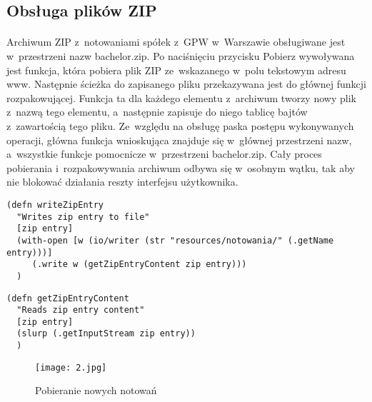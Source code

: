 \subsection{Obsługa plików ZIP}

\paragraph{}
Archiwum ZIP z~notowaniami spółek z~GPW w~Warszawie obsługiwane jest w~przestrzeni nazw bachelor.zip. Po naciśnięciu przycisku Pobierz wywoływana jest funkcja, która pobiera plik ZIP ze~wskazanego w~polu tekstowym adresu www. Następnie ścieżka do zapisanego pliku przekazywana jest do głównej funkcji rozpakowującej. Funkcja ta dla każdego elementu z~archiwum tworzy nowy plik z~nazwą tego elementu, a~następnie zapisuje do niego tablicę bajtów z~zawartością tego pliku. Ze~względu na obsługę paska postępu wykonywanych operacji, główna funkcja wnioskująca znajduje się w~głównej przestrzeni nazw, a~wszystkie funkcje pomocnicze w~przestrzeni bachelor.zip. Cały proces pobierania i~rozpakowywania archiwum odbywa się w~osobnym wątku, tak aby nie blokować działania reszty interfejsu użytkownika.
\pagebreak

\begin{lstlisting}
(defn writeZipEntry
  "Writes zip entry to file"
  [zip entry]
  (with-open [w (io/writer (str "resources/notowania/" (.getName entry)))]
     (.write w (getZipEntryContent zip entry)))
  )
\end{lstlisting}

\begin{lstlisting}
(defn getZipEntryContent
  "Reads zip entry content"
  [zip entry]
  (slurp (.getInputStream zip entry))
  )
\end{lstlisting}

\begin{figure}[H]
	\centering
	\texttt{[image: 2.jpg]}
	\caption{Pobieranie nowych notowań}
	\label{fig:2}
\end{figure}

